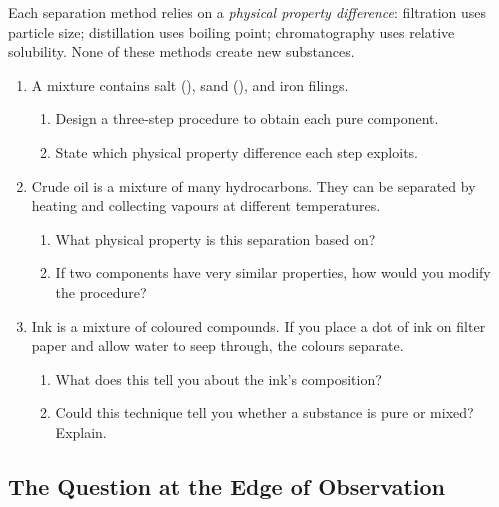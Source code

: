 \documentclass[12pt, a4paper]{book}
\theoremstyle{definition}
\begin{document}
\vspace{0.5em}

Each separation method relies on a \emph{physical property difference}:
filtration uses particle size;
distillation uses boiling point;
chromatography uses relative solubility.
None of these methods create new substances.

\begin{problembox}
\begin{enumerate}[label=\textbf{\arabic*.}]
  \item A mixture contains salt (), sand (),
        and iron filings.
        \begin{enumerate}[label=(\alph*)]
          \item Design a three-step procedure to obtain
                each pure component.
          \item State which physical property difference
                each step exploits.
        \end{enumerate}

  \item Crude oil is a mixture of many hydrocarbons.
        They can be separated by heating and collecting vapours
        at different temperatures.
        \begin{enumerate}[label=(\alph*)]
          \item What physical property is this separation based on?
          \item If two components have very similar properties,
                how would you modify the procedure?
        \end{enumerate}

  \item Ink is a mixture of coloured compounds.
        If you place a dot of ink on filter paper and allow
        water to seep through, the colours separate.
        \begin{enumerate}[label=(\alph*)]
          \item What does this tell you about the ink's composition?
          \item Could this technique tell you whether a substance
                is pure or mixed? Explain.
        \end{enumerate}
\end{enumerate}
\end{problembox}

\subsection{The Question at the Edge of Observation}
\end{document}
